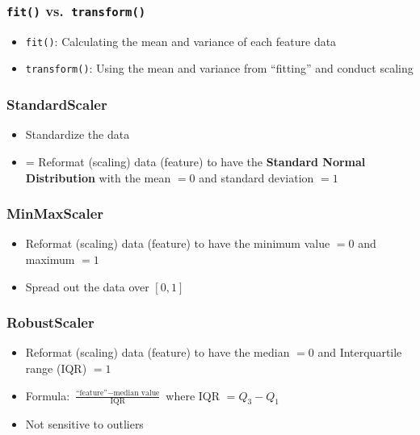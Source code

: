 \documentclass{article}
\begin{document}
\subsubsection*{\texttt{fit()} vs.\ \texttt{transform()}}
\begin{itemize}
    \item \texttt{fit()}: Calculating the mean and variance of each feature data
    \item \texttt{transform()}: Using the mean and variance from ``fitting'' and conduct scaling
\end{itemize}
\subsubsection*{StandardScaler}
\begin{itemize}
    \item Standardize the data
    \item = Reformat (scaling) data (feature) to have the \textbf{Standard Normal Distribution} with the mean $= 0$ and standard deviation $= 1$
\end{itemize}
\subsubsection*{MinMaxScaler}
\begin{itemize}
    \item Reformat (scaling) data (feature) to have the minimum value $= 0$ and maximum $= 1$
    \item Spread out the data over $[0, 1]$
\end{itemize}
\subsubsection*{RobustScaler}
\begin{itemize}
    \item Reformat (scaling) data (feature) to have the median $= 0$ and Interquartile range (IQR) $= 1$
    \item Formula: $\frac{\text{``feature''} - \text{median value}}{\text{IQR}}$ where IQR $= Q_3 - Q_1$
    \item Not sensitive to outliers
\end{itemize}
\end{document}
